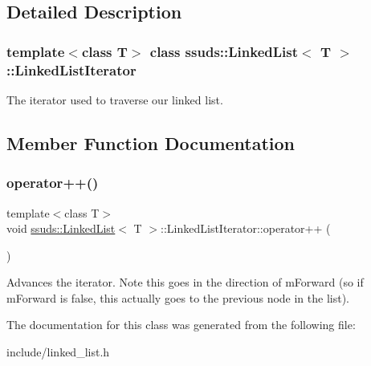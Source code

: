 \subsection{Detailed Description}
\subsubsection*{template$<$class T$>$\newline
class ssuds\+::\+Linked\+List$<$ T $>$\+::\+Linked\+List\+Iterator}

The iterator used to traverse our linked list. 

\subsection{Member Function Documentation}
\mbox{\label{classssuds_1_1_linked_list_1_1_linked_list_iterator_ae4c4442dc4b48e1d8abe8af011edf896}} 
\subsubsection{\texorpdfstring{operator++()}{operator++()}}
{\footnotesize\ttfamily template$<$class T$>$ \\
void \mbox{\hyperlink{classssuds_1_1_linked_list}{ssuds\+::\+Linked\+List}}$<$ T $>$\+::Linked\+List\+Iterator\+::operator++ (\begin{DoxyParamCaption}{ }\end{DoxyParamCaption})\hspace{0.3cm}{\ttfamily [inline]}}

Advances the iterator. Note this goes in the direction of m\+Forward (so if m\+Forward is false, this actually goes to the previous node in the list). 

The documentation for this class was generated from the following file\+:\begin{DoxyCompactItemize}
\item 
include/linked\+\_\+list.\+h\end{DoxyCompactItemize}
